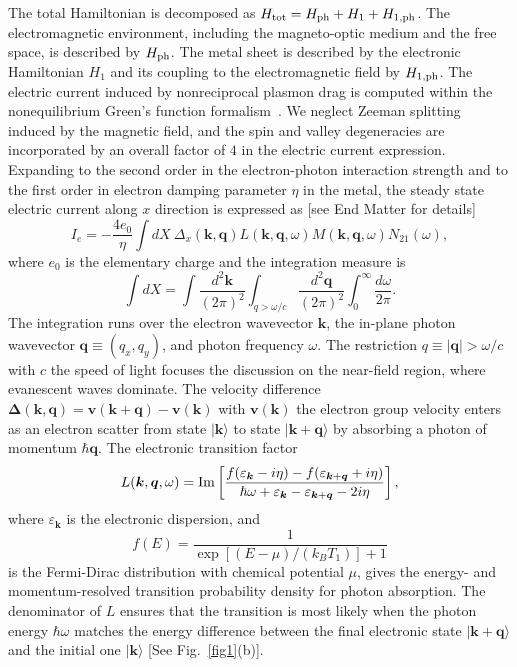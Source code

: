 \documentclass[aps,prl,twocolumn,longbibliography]{revtex4-2}
\begin{document}
The total Hamiltonian is decomposed as $H_{\rm tot} = H_{\rm ph} + H_1 + H_{1, {\rm ph}}$.
The electromagnetic environment, including the magneto-optic medium and the free space, is
described by $H_{\rm ph}$. The metal sheet is described by the electronic Hamiltonian
$H_1$ and its coupling to the electromagnetic field by $H_{1, {\rm ph}}$. The electric
current induced by nonreciprocal plasmon drag is computed within the nonequilibrium
Green's function formalism~\cite{Haug_Jauho}.
We neglect Zeeman splitting induced by the magnetic field, and the spin and
valley degeneracies are incorporated by an overall factor of $4$ in the electric current
expression. Expanding to the second order in the electron-photon interaction strength and
to the first order in electron damping parameter $\eta$ in the metal, the steady state
electric current along $x$ direction is expressed as [see End Matter for details]
\begin{equation} \label{Ie}
  I_e = -\frac{4 e_0}{\eta} \int d X \ \Delta_x(\bm{k},\bm{q}) L(\bm{k}, \bm{q}, \omega)
  M(\bm{k}, \bm{q}, \omega) N_{21}(\omega) ,
\end{equation}
where $e_0$ is the elementary charge and the integration measure is
\begin{equation*}
  \int dX = \int \frac{d^2\bm{k}}{(2\pi)^2} \int_{q>\omega/c}
  \frac{d^2\bm{q}}{(2\pi)^2} \int_0^\infty \frac{d\omega}{2\pi} .
\end{equation*}
The integration runs over the electron wavevector $\bm{k}$, the in-plane photon wavevector
$\bm{q}\equiv (q_x, q_y)$, and photon frequency $\omega$.
The restriction $q \equiv |\bm{q}|>\omega / c$ with $c$ the speed of light focuses the
discussion on the near-field region, where evanescent waves dominate.
The velocity difference $\bm{\Delta}(\bm{k},\bm{q}) = \bm{v}(\bm{k} + \bm{q})
- \bm{v}(\bm{k})$
with $\bm{v}(\bm{k})$ the electron group velocity enters as an electron scatter from
state $|\bm{k}\rangle$ to state $|\bm{k} + \bm{q}\rangle$ by absorbing a photon of
momentum $\hbar\bm{q}$.
The electronic transition factor
\begin{equation} \label{L}
  L(\bm{k},\bm{q}, \omega) = {\rm Im} \left[ \frac{f(\varepsilon_{\bm{k}}-i
  \eta)-f(\varepsilon_{\bm{k}+\bm{q}}+i \eta)}{\hbar\omega +
  \varepsilon_{\bm{k}}-\varepsilon_{\bm{k}+\bm{q}} -2i \eta} \right] ,
\end{equation}
where $\varepsilon_{\bm{k}}$ is the electronic dispersion, and
\begin{equation} \label{Fermi-Dirac}
  f(E) = \frac{1}{\exp[(E-\mu)/(k_B T_1)]+1}
\end{equation}
is the Fermi-Dirac distribution with chemical potential $\mu$, gives the energy- and
momentum-resolved transition probability density for photon absorption.
The denominator of $L$ ensures that the transition is most likely when the photon energy
$\hbar\omega$ matches the energy difference between the final electronic state $|\bm{k} +
\bm{q}\rangle$ and the initial one $|\bm{k} \rangle$ [See Fig.~\ref{fig1}(b)].
\end{document}
